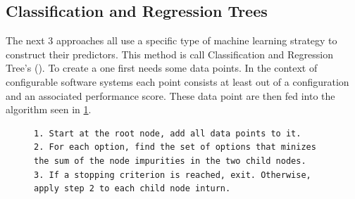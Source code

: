 \subsection{Classification and Regression Trees}
\label{sec:CART}
The next 3 approaches all use a specific type of machine learning strategy to construct their predictors. This method is call Classification and Regression Tree's (\CART).
To create a \CART one first needs some data points. In the context of configurable software systems each point consists at least out of a configuration and an associated performance score. These data point are then fed into the algorithm seen in
 \cref{alg:CART}.
\begin{figure}
	\lstset{
		mathescape,
		breaklines=true,
	}
	\begin{lstlisting}
1. Start at the root node, add all data points to it.
2. For each option, find the set of options that minizes the sum of the node impurities in the two child nodes.
3. If a stopping criterion is reached, exit. Otherwise, apply step 2 to each child node inturn.
	\end{lstlisting}
	\label{alg:CART}
\end{figure}

